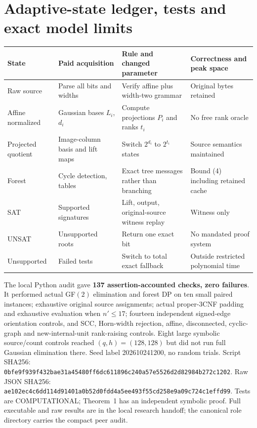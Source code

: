 \documentclass[11pt]{article}
\begin{document}
\section{Adaptive-state ledger, tests and exact model limits}
\small
\begin{center}
\begin{tabular}{p{.18\linewidth}p{.23\linewidth}p{.24\linewidth}p{.25\linewidth}}
\toprule
State & Paid acquisition & Rule and changed parameter & Correctness and peak space\\\midrule
Raw source & Parse all bits and widths & Verify affine plus width-two grammar & Original bytes retained\\
Affine normalized & Gaussian bases $L_i$, $d_i$ & Compute projections $P_i$ and ranks $t_i$ & No free rank oracle\\
Projected quotient & Image-column basis and lift maps & Switch $2^{d_i}$ to $2^{t_i}$ states & Source semantics maintained\\
Forest & Cycle detection, tables & Exact tree messages rather than branching & Bound (4) including retained cache\\
SAT & Supported signatures & Lift, output, original-source witness replay & Witness only\\
UNSAT & Unsupported roots & Return one exact bit & No mandated proof system\\
Unsupported & Failed tests & Switch to total exact fallback & Outside restricted polynomial time\\
\bottomrule
\end{tabular}
\end{center}
\normalsize

The local Python audit gave \textbf{137 assertion-accounted checks,
zero failures}. It performed actual GF$(2)$ elimination and
forest DP on ten small paired instances; exhaustive original
source assignments; actual proper-3CNF padding and exhaustive
evaluation when $n'\le17$; fourteen independent signed-edge
orientation controls, and SCC, Horn-width rejection, affine,
disconnected, cyclic-graph and new-internal-unit rank-raising
controls. Eight large symbolic source/count controls reached
$(q,h)=(128,128)$ but did not run full Gaussian elimination
there. Seed label 202610241200, no random trials. Script SHA256:
\texttt{0bfe9f939f432bae31a45480ff6dc611896c240a57e5526d2d82984b272c1202}.
Raw JSON SHA256:
\texttt{ae102ec4c6dd114d91401a0b52d0fdd4a5ee493f55cd258e9a09c724c1effd99}.
Tests are COMPUTATIONAL; Theorem~1 has an independent symbolic proof.
Full executable and raw results are in the local research handoff;
the canonical role directory carries the compact peer audit.
\end{document}
